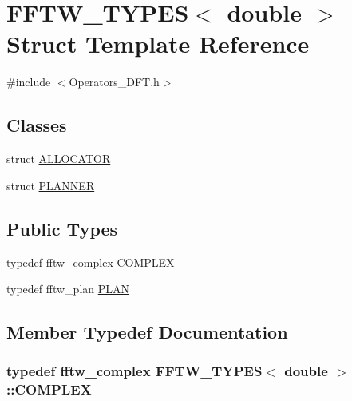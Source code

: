 \hypertarget{struct_f_f_t_w___t_y_p_e_s_3_01double_01_4}{}\section{F\+F\+T\+W\+\_\+\+T\+Y\+P\+E\+S$<$ double $>$ Struct Template Reference}
\label{struct_f_f_t_w___t_y_p_e_s_3_01double_01_4}


{\ttfamily \#include $<$Operators\+\_\+\+D\+F\+T.\+h$>$}

\subsection*{Classes}
\begin{DoxyCompactItemize}
\item 
struct \hyperlink{struct_f_f_t_w___t_y_p_e_s_3_01double_01_4_1_1_a_l_l_o_c_a_t_o_r}{A\+L\+L\+O\+C\+A\+T\+O\+R}
\item 
struct \hyperlink{struct_f_f_t_w___t_y_p_e_s_3_01double_01_4_1_1_p_l_a_n_n_e_r}{P\+L\+A\+N\+N\+E\+R}
\end{DoxyCompactItemize}
\subsection*{Public Types}
\begin{DoxyCompactItemize}
\item 
typedef fftw\+\_\+complex \hyperlink{struct_f_f_t_w___t_y_p_e_s_3_01double_01_4_a9e1b7d8a842e1afab769065e5873f78c}{C\+O\+M\+P\+L\+E\+X}
\item 
typedef fftw\+\_\+plan \hyperlink{struct_f_f_t_w___t_y_p_e_s_3_01double_01_4_a19c1538d166a5a9f01680c00253850ac}{P\+L\+A\+N}
\end{DoxyCompactItemize}


\subsection{Member Typedef Documentation}
\hypertarget{struct_f_f_t_w___t_y_p_e_s_3_01double_01_4_a9e1b7d8a842e1afab769065e5873f78c}{}
\subsubsection[{C\+O\+M\+P\+L\+E\+X}]{\setlength{\rightskip}{0pt plus 5cm}typedef fftw\+\_\+complex {\bf F\+F\+T\+W\+\_\+\+T\+Y\+P\+E\+S}$<$ double $>$\+::{\bf C\+O\+M\+P\+L\+E\+X}}\label{struct_f_f_t_w___t_y_p_e_s_3_01double_01_4_a9e1b7d8a842e1afab769065e5873f78c}
\hypertarget{struct_f_f_t_w___t_y_p_e_s_3_01double_01_4_a19c1538d166a5a9f01680c00253850ac}{}
